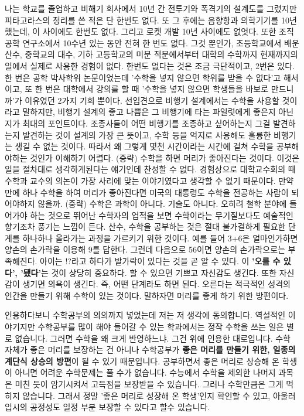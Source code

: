 나는 학교를 졸업하고 비해기 회사에서 10년 간 전투기와 폭격기의 설계도를 그렸지만 피타고라스의 정리를 쓴 적은 단 한번도 없다. 또 그 후에는 음향항과 의학기기를 10년 했는데, 이 사이에도 한번도 없다. 그리고 로켓 개발 10년 사이에도 없엇다. 또한 조직공학 연구소에서 10수년 있는 동안 전혀 한 번도 없다. 그것 뿐인가, 초등학교에서 배운 산수, 중학교의 대수, 기하 고등학교의 미분 적분에서부터 대학의 수학까지 현재까지의 일에서 실제로 사용한 경험이 없다.
한번도 없다는 것은 조금 극단적이고, 2번은 있다. 한 번은 공학 박사학위 논문이었는데 '수학을 넣지 않으면 학위를 받을 수 없다'고 해서이고, 또 한 번은 대학에서 강의를 할 때 '수학을 넣지 않으면 학생들을 바보로 만드니까'가 이유였던 2가지 기회 뿐이다.
선입견으로 비행기 설계에서는 수학을 사용할 것이라고 말하지만, 비행기 설계의 좋고 나쁨은 그 비행기에 타는 파일럿에게 좋은지 아닌지가 최대의 포인트이다. 조종사들이 어떤 비행기를 조종하고 싶어하는지 그걸 발견하는지 발견하는 것이 설계의 가장 큰 뜻이고, 수학 등을 억지로 사용해도 훌륭한 비행기는 생길 수 없는 것이다. 따라서 왜 그렇게 몇천 시간이라는 시간에 걸쳐 수학을 공부해야하는 것인가 이해하기 어렵다.
(중략)
수학을 하면 머리가 좋아진다는 것이다. 이것은 일을 절차대로 생각하게된다는 얘기인데 찬성할 수 없다. 경험상으로 대학교수회의 때 수학과 교수의 의논이 가장 사리에 맞는 이야기였다고 생각할 수 없기 때문이다. 만약 만에 하나 수학을 하여 머리가 좋아진다면 미국의 대통령도 수학을 전공하는 사람이 되어야하지 않을까.
(중략)
수학은 과학이 아니다. 기술도 아니다. 오히려 철학 분야에 들어가야 하는 것으로 뛰어난 수학자의 업적을 보면 수학이라는 무기질보다도 예술적인 향기조차 풍기는 느낌이 든다. 산수, 수학을 공부하는 것은 절대 불가결하게 필요한 단계를 하나하나 올라가는 과정을 가르키기 위한 것이다. 예를 들어 3+6은 얼마인가하면 양손의 손가락을 이용해 9를 답한다. 그런데 다음으로 56이면 양손의 손가락으로는 부족해진다. 아이는 !?라고 하다가 발가락이 있다는 것을 곧 알 수 있다. 이 \textbf{'오를 수 있다', '됐다'}는 것이 상당히 중요하다. 할 수 있으면 기쁘고 자신감도 생긴다. 또한 자신감이 생기면 의욕이 생긴다. 즉, 어떤 단계라도 하면 된다.
오른다는 적극적인 성격의 인간을 만들기 위해 수학이 있는 것이다. 말하자면 머리를 좋게 하기 위한 방편이다.
\vspace{5mm}

인용하다보니 수학공부의 의의까지 넣었는데 저는 저 생각에 동의합니다.
역설적인 이야기지만 수학공부를 많이 해야 들어갈 수 있는 학과에서는 정작 수학을 쓰는 일은 별로 없습니다.
그러면 수학을 왜 크게 반영하느냐. 그건 위에 인용한 대로입니다. 수학 자체가 좋은 머리를 보장하는 건 아니나
수학공부가 \textbf{좋은 머리를 만들기 위한, 일종의 계단식 상승의 방편}이 될 수 있기 때문입니다.
공부하면서 좋은 머리로 상승해 온 학생이 아니면 어려운 수학문제는 풀 수가 없습니다.
수능에서 수학을 제외한 나머지 과목은 미친 듯이 암기시켜서 고득점을 보장받을 수 있습니다.
그러나 수학만큼은 그게 먹히지 않습니다. 그래서 정말 '좋은 머리로 성장해 온 학생'인지 확인할 수 있고,
아울러 입시의 공정성도 일정 부분 보장할 수 있다고 할수 있습니다.
\vspace{5mm}

